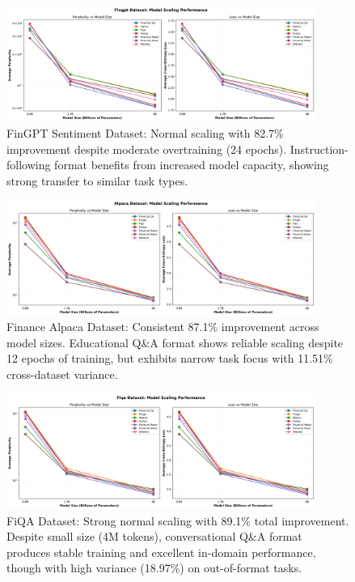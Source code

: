 \begin{figure}[h]
\centering
\includegraphics[width=0.9\textwidth]{figures/scaling_fingpt.png}
\caption[FinGPT Sentiment Dataset: Scaling Behavior]{FinGPT Sentiment Dataset: Normal scaling with 82.7\% improvement despite moderate overtraining (24 epochs). Instruction-following format benefits from increased model capacity, showing strong transfer to similar task types.}
\label{fig:scaling_fingpt}
\end{figure}

\begin{figure}[h]
\centering
\includegraphics[width=0.9\textwidth]{figures/scaling_alpaca.png}
\caption[Finance Alpaca Dataset: Scaling Behavior]{Finance Alpaca Dataset: Consistent 87.1\% improvement across model sizes. Educational Q\&A format shows reliable scaling despite 12 epochs of training, but exhibits narrow task focus with 11.51\% cross-dataset variance.}
\label{fig:scaling_alpaca}
\end{figure}

\begin{figure}[h]
\centering
\includegraphics[width=0.9\textwidth]{figures/scaling_fiqa.png}
\caption[FiQA Dataset: Scaling Behavior]{FiQA Dataset: Strong normal scaling with 89.1\% total improvement. Despite small size (4M tokens), conversational Q\&A format produces stable training and excellent in-domain performance, though with high variance (18.97\%) on out-of-format tasks.}
\label{fig:scaling_fiqa}
\end{figure}

